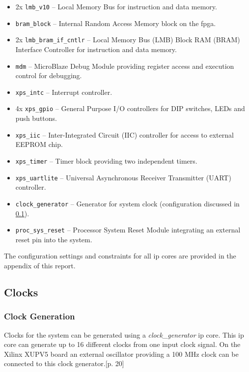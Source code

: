 \begin{itemize}
  \setlength{\itemsep}{1pt}
  \setlength{\parskip}{2pt}
  \setlength{\parsep}{0pt}
\item 2x \texttt{lmb\_v10} -- Local Memory Bus for instruction and data memory.
\item \texttt{bram\_block} -- Internal Random Access Memory block on the \gls{fpga}.
\item 2x \texttt{lmb\_bram\_if\_cntlr} -- Local Memory Bus (LMB) Block RAM (BRAM) Interface Controller for instruction and data memory.
\item \texttt{mdm} -- MicroBlaze Debug Module providing register access and execution control for debugging.
\item \texttt{xps\_intc} -- Interrupt controller.
\item 4x \texttt{xps\_gpio} -- General Purpose I/O controllers for DIP switches, LEDs and push buttons.
\item \texttt{xps\_iic} -- Inter-Integrated Circuit (IIC) controller for access to external EEPROM chip.
\item \texttt{xps\_timer} -- Timer block providing two independent timers.
\item \texttt{xps\_uartlite} -- Universal Asynchronous Receiver Transmitter (UART) controller.
\item \texttt{clock\_generator} -- Generator for system clock (configuration discussed in \ref{sec:clocks}).
\item \texttt{proc\_sys\_reset} -- Processor System Reset Module integrating an external reset pin into the system.
\end{itemize}

The configuration settings and constraints for all \gls{ip} cores are provided in the appendix of this report.

\subsection{Clocks}
\label{sec:clocks}

\subsubsection{Clock Generation}

Clocks for the system can be generated using a \textit{clock\_generator} \gls{ip} core. This \gls{ip} core can generate up to 16 different clocks from one input clock signal. On the Xilinx XUPV5 board an external oscillator providing a 100 MHz clock can be connected to this clock generator.\cite{ug347}[p. 20]

